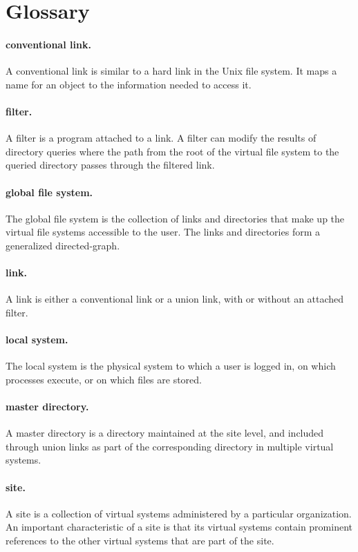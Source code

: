 \section{Glossary}

\paragraph{conventional link.} A conventional link is similar to
a hard link in the Unix file system.  It maps a name for an object to
the information needed to access it.

\paragraph{filter.} A filter is a program attached to a link.
A filter can modify the results of directory queries where the path
from the root of the virtual file system to the queried directory
passes through the filtered link.

\paragraph{global file system.}  The global file system is the collection
of links and directories that make up the virtual file systems
accessible to the user.  The links and directories form a generalized
directed-graph. 

\paragraph{link.}  A link is either a conventional link or a union
link, with or without an attached filter.

\paragraph{local system.}  The local system is the physical system to
which a user is logged in, on which processes execute, or on which
files are stored. 

\paragraph{master directory.}  A master directory is a directory
maintained at the site level, and included through union links as part
of the corresponding directory in multiple virtual systems.

\paragraph{site.}  A site is a collection of virtual systems
administered by a particular organization.  An important
characteristic of a site is that its virtual systems contain prominent
references to the other virtual systems that are part of the site.

